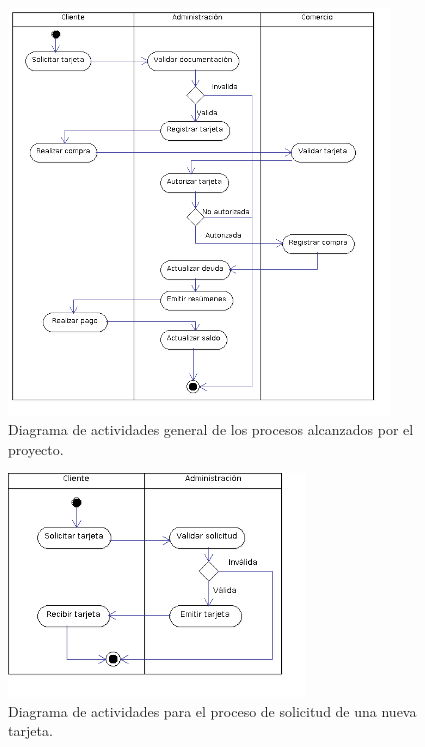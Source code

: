 \begin{figure}[htb]
\begin{center}
\includegraphics[width=0.9\textwidth]{images/mod_negocio_act_global.png}
\end{center}
\caption{Diagrama de actividades general de los procesos alcanzados por el
proyecto.}
\end{figure}

\begin{figure}[htb]
\begin{center}
\includegraphics[width=0.7\textwidth]{images/mod_negocio_act_solicitudtarjeta.png}
\end{center}
\caption{Diagrama de actividades para el proceso de solicitud de una nueva
tarjeta.}
\end{figure}

